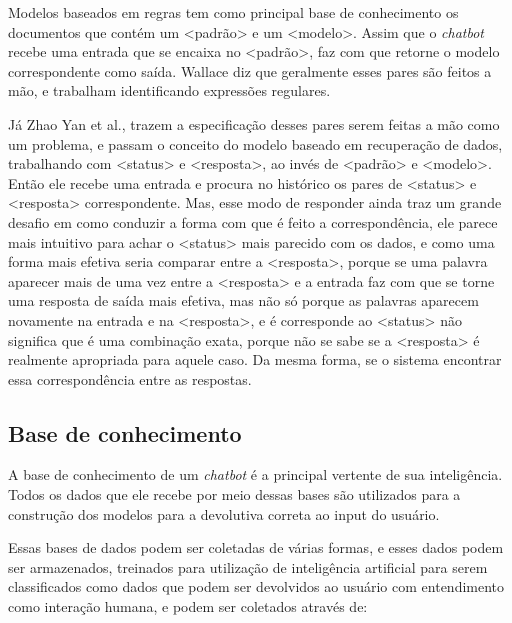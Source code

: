 \documentclass[
	12pt,				%
	oneside,
	a4paper,			%
	english,			%
	french,				%
	spanish,			%
	brazil				%
	]{abntex2}
\begin{document}
Modelos baseados em regras tem como principal base de conhecimento os documentos que contém um <padrão> e um <modelo>. Assim que o \emph{chatbot} recebe uma entrada que se encaixa no <padrão>, faz com que retorne o modelo correspondente como saída. Wallace diz que geralmente esses pares são feitos a mão, e trabalham identificando expressões regulares.

Já Zhao Yan et al., trazem a especificação desses pares serem feitas a mão como um problema, e passam o conceito do modelo baseado em recuperação de dados, trabalhando com <status> e <resposta>, ao invés de <padrão> e <modelo>. Então ele recebe uma entrada e procura no histórico os pares de <status> e <resposta> correspondente. Mas, esse modo de responder ainda traz um grande desafio em como conduzir a forma com que é feito a correspondência, ele parece mais intuitivo para achar o <status> mais parecido com os dados, e como uma forma mais efetiva seria comparar entre a <resposta>, porque se uma palavra aparecer mais de uma vez entre a <resposta> e a entrada faz com que se torne uma resposta de saída mais efetiva, mas não só porque as palavras aparecem novamente na entrada e na <resposta>, e é corresponde ao <status> não significa que é uma combinação exata, porque não se sabe se a <resposta> é realmente apropriada para aquele caso. Da mesma forma, se o sistema encontrar essa correspondência entre as respostas.

\subsection{Base de conhecimento}
A base de conhecimento de um \emph{chatbot} é a principal vertente de sua inteligência. Todos os dados que ele recebe por meio dessas bases são utilizados para a construção dos modelos para a devolutiva correta ao input do usuário.

Essas bases de dados podem ser coletadas de várias formas, e esses dados podem ser armazenados, treinados para utilização de inteligência artificial para serem classificados como dados que podem ser devolvidos ao usuário com entendimento como interação humana, e podem ser coletados através de:
\end{document}
